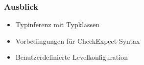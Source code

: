 \begin{frame}
	\frametitle{Ausblick}
	\begin{itemize}[<+->]
		\item{Typinferenz mit Typklassen}
		\item{Vorbedingungen für CheckExpect-Syntax}
		\item{Benutzerdefinierte Levelkonfiguration}
	\end{itemize}
\end{frame}